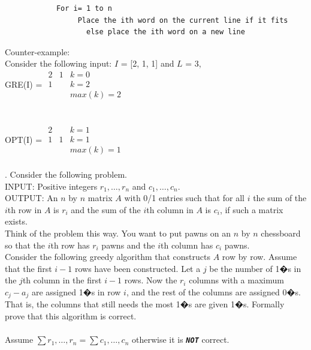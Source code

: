 \documentclass[10pt]{article}
\begin{document}
			\begin{verbatim}
			For i= 1 to n
			     Place the ith word on the current line if it fits
			       else place the ith word on a new line
			\end{verbatim}
			Counter-example:\\
			Consider the following input: $I$ = [2, 1, 1] and $L$ = 3,\\
			GRE(I) = $
			\begin{array}{ccc}
				2 & 1 & k = 0\\
				1 &   & k = 2\\
				  &   & max(k) = 2
			\end{array}$
			\\
			\\
			\\
			OPT(I) = $
			\begin{array}{ccc}
				2 &   & k = 1\\
				1 & 1 & k = 1\\
				  &   & max(k) = 1
			\end{array}$\\
			\\			
			\newpage
			. Consider the following problem.\\
			INPUT: Positive integers $r_{1}, \ldots, r_{n}$ and $c_{1}, \ldots , c_{n}$.\\
			OUTPUT: An $n$ by $n$ matrix $A$ with 0/1 entries such that for all $i$ the sum of the $i$th row in $A$ is $r_{i}$
			and the sum of the $i$th column in $A$ is $c_{i}$, if such a matrix exists.\\
			Think of the problem this way.  You want to put pawns on an $n$ by $n$ chessboard so that the $i$th row
			has $r_{i}$ pawns and the $i$th column has $c_{i}$ pawns.\\
			Consider the following greedy algorithm that constructs $A$ row by row.  Assume that the first $i - 1$
			rows have been constructed. Let a $j$ be the number of 1�s in the $j$th column in the first $i - 1$ rows. Now
			the $r_{i}$ columns with a maximum $c_{j} - a_{j}$ are assigned 1�s in row $i$, and the rest of the columns are
			assigned 0�s. That is, the columns that still needs the most 1�s are given 1�s. Formally prove that this
			algorithm is correct.\\
			\\
			Assume $\sum r_{1}, \ldots, r_{n} = \sum c_{1}, \ldots , c_{n}$ otherwise it is \textsc{\texttt{\textsl{\textit{\textbf{NOT}}}}} correct.\\
\end{document}
